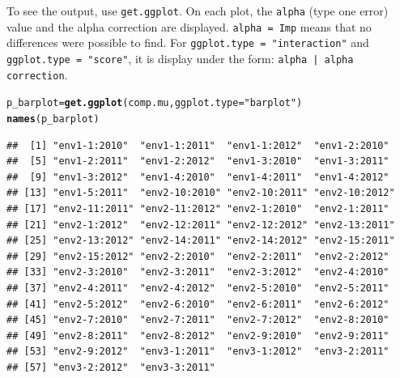 \documentclass{article}\usepackage[]{graphicx}\usepackage[]{color}
\makeatletter
\newcommand{\hlstr}[1]{\textcolor[rgb]{0.192,0.494,0.8}{#1}}%
\newcommand{\hlstd}[1]{\textcolor[rgb]{0.345,0.345,0.345}{#1}}%
\newcommand{\hlkwb}[1]{\textcolor[rgb]{0.69,0.353,0.396}{#1}}%
\newcommand{\hlkwc}[1]{\textcolor[rgb]{0.333,0.667,0.333}{#1}}%
\newcommand{\hlkwd}[1]{\textcolor[rgb]{0.737,0.353,0.396}{\textbf{#1}}}%
\newenvironment{kframe}{%
 \def\at@end@of@kframe{}%
 \ifinner\ifhmode%
  \def\at@end@of@kframe{\end{minipage}}%
  \begin{minipage}{\columnwidth}%
 \fi\fi%
 \def\FrameCommand##1{\hskip\@totalleftmargin \hskip-\fboxsep
 \colorbox{shadecolor}{##1}\hskip-\fboxsep
     \hskip-\linewidth \hskip-\@totalleftmargin \hskip\columnwidth}%
 \MakeFramed {\advance\hsize-\width
   \@totalleftmargin\z@ \linewidth\hsize
   \@setminipage}}%
 {\par\unskip\endMakeFramed%
 \at@end@of@kframe}
\newenvironment{knitrout}{}{} %
\makeatother
\begin{document}
To see the output, use \texttt{get.ggplot}.
On each plot, the \texttt{alpha} (type one error) value and the alpha correction are displayed.
\texttt{alpha = Imp} means that no differences were possible to find.
For \texttt{ggplot.type = "interaction"} and \texttt{ggplot.type = "score"}, it is display under the form: \texttt{alpha | alpha correction}.

\begin{knitrout}
\color{fgcolor}\begin{kframe}
\begin{alltt}
\hlstd{p_barplot} \hlkwb{=} \hlkwd{get.ggplot}\hlstd{(comp.mu,} \hlkwc{ggplot.type} \hlstd{=} \hlstr{"barplot"}\hlstd{)}
\hlkwd{names}\hlstd{(p_barplot)}
\end{alltt}
\begin{verbatim}
##  [1] "env1-1:2010"  "env1-1:2011"  "env1-1:2012"  "env1-2:2010" 
##  [5] "env1-2:2011"  "env1-2:2012"  "env1-3:2010"  "env1-3:2011" 
##  [9] "env1-3:2012"  "env1-4:2010"  "env1-4:2011"  "env1-4:2012" 
## [13] "env1-5:2011"  "env2-10:2010" "env2-10:2011" "env2-10:2012"
## [17] "env2-11:2011" "env2-11:2012" "env2-1:2010"  "env2-1:2011" 
## [21] "env2-1:2012"  "env2-12:2011" "env2-12:2012" "env2-13:2011"
## [25] "env2-13:2012" "env2-14:2011" "env2-14:2012" "env2-15:2011"
## [29] "env2-15:2012" "env2-2:2010"  "env2-2:2011"  "env2-2:2012" 
## [33] "env2-3:2010"  "env2-3:2011"  "env2-3:2012"  "env2-4:2010" 
## [37] "env2-4:2011"  "env2-4:2012"  "env2-5:2010"  "env2-5:2011" 
## [41] "env2-5:2012"  "env2-6:2010"  "env2-6:2011"  "env2-6:2012" 
## [45] "env2-7:2010"  "env2-7:2011"  "env2-7:2012"  "env2-8:2010" 
## [49] "env2-8:2011"  "env2-8:2012"  "env2-9:2010"  "env2-9:2011" 
## [53] "env2-9:2012"  "env3-1:2011"  "env3-1:2012"  "env3-2:2011" 
## [57] "env3-2:2012"  "env3-3:2011"
\end{verbatim}
\end{kframe}
\end{knitrout}
\end{document}
